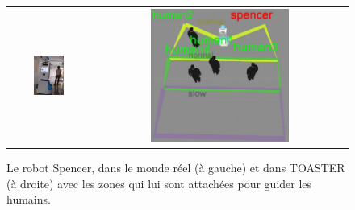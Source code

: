 \documentclass[a4paper,11pt,twoside]{StyleThese}
\begin{document}
 \begin{figure}[ht!]
 \centering
 \begin{tabular}{cc}
   \vspace{-5pt}
  \includegraphics[width=0.4\textwidth]{img/spencer_guidingShrink.png} &
  \includegraphics[width=0.56\textwidth]{img/toaster_spencer.jpg}
 \end{tabular}
 \caption{Le robot Spencer, dans le monde réel (à gauche) et dans TOASTER (à droite) avec les zones qui lui sont attachées pour guider les humains.}
 \label{fig:spencer}
 \end{figure}
 
 
\end{document}
